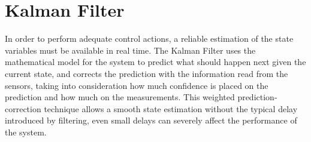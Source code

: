 \documentclass[conference]{IEEEtran}
\begin{document}
\section{Kalman Filter}

In order to perform adequate control actions, a reliable estimation of the state variables must be available in real time. The Kalman Filter uses the mathematical model for the system to predict what should happen next given the current state, and corrects the prediction with the information read from the sensors, taking into consideration how much confidence is placed on the prediction and how much on the measurements. This weighted prediction-correction technique allows a smooth state estimation without the typical delay introduced by filtering, even small delays can severely affect the performance of the system.
\end{document}
